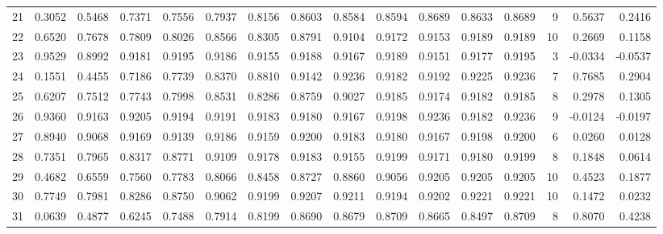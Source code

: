 \begin{tabular}{lrrrrrrrrrrrrrrr}
21  &      0.3052 &  0.5468 &  0.7371 &  0.7556 &  0.7937 &  0.8156 &  0.8603 &  0.8584 &  0.8594 &  0.8689 &   0.8633 &     0.8689 &      9 &                    0.5637 &                     0.2416 \\
22  &      0.6520 &  0.7678 &  0.7809 &  0.8026 &  0.8566 &  0.8305 &  0.8791 &  0.9104 &  0.9172 &  0.9153 &   0.9189 &     0.9189 &     10 &                    0.2669 &                     0.1158 \\
23  &      0.9529 &  0.8992 &  0.9181 &  0.9195 &  0.9186 &  0.9155 &  0.9188 &  0.9167 &  0.9189 &  0.9151 &   0.9177 &     0.9195 &      3 &                   -0.0334 &                    -0.0537 \\
24  &      0.1551 &  0.4455 &  0.7186 &  0.7739 &  0.8370 &  0.8810 &  0.9142 &  0.9236 &  0.9182 &  0.9192 &   0.9225 &     0.9236 &      7 &                    0.7685 &                     0.2904 \\
25  &      0.6207 &  0.7512 &  0.7743 &  0.7998 &  0.8531 &  0.8286 &  0.8759 &  0.9027 &  0.9185 &  0.9174 &   0.9182 &     0.9185 &      8 &                    0.2978 &                     0.1305 \\
26  &      0.9360 &  0.9163 &  0.9205 &  0.9194 &  0.9191 &  0.9183 &  0.9180 &  0.9167 &  0.9198 &  0.9236 &   0.9182 &     0.9236 &      9 &                   -0.0124 &                    -0.0197 \\
27  &      0.8940 &  0.9068 &  0.9169 &  0.9139 &  0.9186 &  0.9159 &  0.9200 &  0.9183 &  0.9180 &  0.9167 &   0.9198 &     0.9200 &      6 &                    0.0260 &                     0.0128 \\
28  &      0.7351 &  0.7965 &  0.8317 &  0.8771 &  0.9109 &  0.9178 &  0.9183 &  0.9155 &  0.9199 &  0.9171 &   0.9180 &     0.9199 &      8 &                    0.1848 &                     0.0614 \\
29  &      0.4682 &  0.6559 &  0.7560 &  0.7783 &  0.8066 &  0.8458 &  0.8727 &  0.8860 &  0.9056 &  0.9205 &   0.9205 &     0.9205 &     10 &                    0.4523 &                     0.1877 \\
30  &      0.7749 &  0.7981 &  0.8286 &  0.8750 &  0.9062 &  0.9199 &  0.9207 &  0.9211 &  0.9194 &  0.9202 &   0.9221 &     0.9221 &     10 &                    0.1472 &                     0.0232 \\
31  &      0.0639 &  0.4877 &  0.6245 &  0.7488 &  0.7914 &  0.8199 &  0.8690 &  0.8679 &  0.8709 &  0.8665 &   0.8497 &     0.8709 &      8 &                    0.8070 &                     0.4238 \\

\end{tabular}
